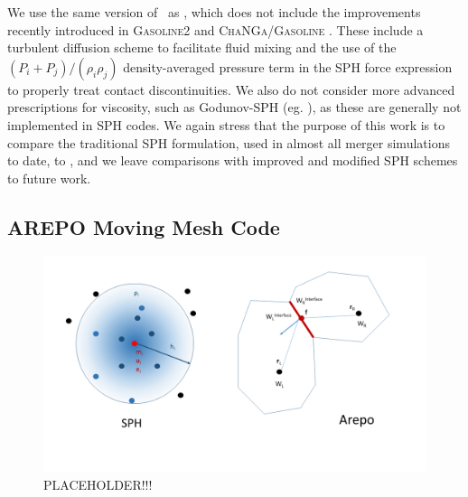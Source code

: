 We use the same version of \gasoline\ as \citeal{zhu+13}, which does not include the improvements recently introduced in \textsc{Gasoline2} \citep{kell+15, tamb+15} and \textsc{ChaNGa/Gasoline} \citep{gove+15}.  These include a turbulent diffusion scheme to facilitate fluid mixing \citep{shen+10} and the use of the $(P_i + P_j)/(\rho_i\rho_j)$ density-averaged pressure term in the SPH force expression \citep{kell+14} to properly treat contact discontinuities.  We also do not consider more advanced prescriptions for viscosity, such as Godunov-SPH (eg. \citealt{chaw16}), as these are generally not implemented in SPH codes.  We again stress that the purpose of this work is to compare the traditional SPH formulation, used in almost all merger simulations to date, to \arepo, and we leave comparisons with improved and modified SPH schemes to future work.


\subsection{AREPO Moving Mesh Code}
\label{ssec:c3_arepo}

\begin{figure}
\centering
\includegraphics[angle=0,width=1.0\columnwidth]{chapter3_zhu+u/figures/SPHArepoFig.png}
\caption{{\charles PLACEHOLDER!!!}}
\label{fig:c3_codediag}
\end{figure}


